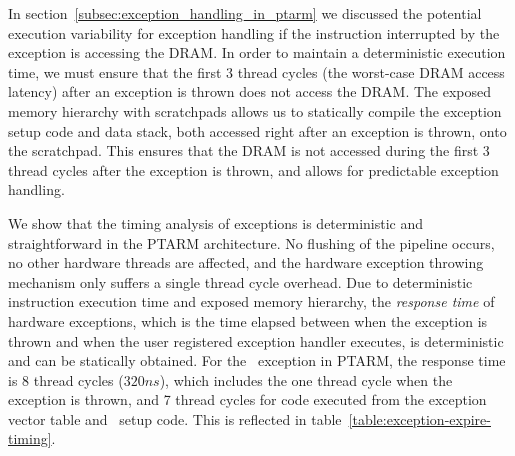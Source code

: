 In section~\ref{subsec:exception_handling_in_ptarm} we discussed the potential execution variability for exception handling if the instruction interrupted by the exception is accessing the DRAM. 
In order to maintain a deterministic execution time, we must ensure that the first 3 thread cycles (the worst-case DRAM access latency) after an exception is thrown does not access the DRAM. 
The exposed memory hierarchy with scratchpads allows us to statically compile the exception setup code and data stack, both accessed right after an exception is thrown, onto the scratchpad. 
This ensures that the DRAM is not accessed during the first 3 thread cycles after the exception is thrown, and allows for predictable exception handling.

We show that the timing analysis of exceptions is deterministic and straightforward in the PTARM architecture.
No flushing of the pipeline occurs, no other hardware threads are affected, and the hardware exception throwing mechanism only suffers a single thread cycle overhead.
Due to deterministic instruction execution time and exposed memory hierarchy, the \emph{response time} of hardware exceptions, which is the time elapsed between when the exception is thrown and when the user registered exception handler executes, is deterministic and can be statically obtained. 
For the \timerexpired\ exception in PTARM, the response time is 8 thread cycles ($320ns$), which includes the one thread cycle when the exception is thrown, and 7 thread cycles for code executed from the exception vector table and \timerexpired\ setup code.   
This is reflected in table~\ref{table:exception-expire-timing}.



